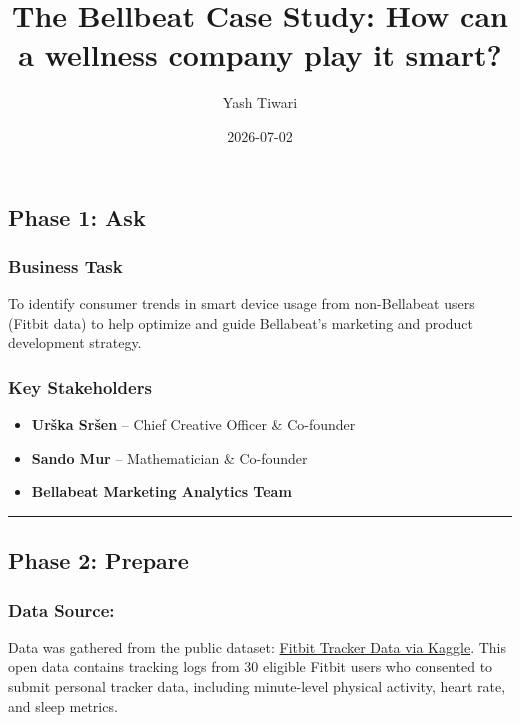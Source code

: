 \documentclass[
]{article}
\title{The Bellbeat Case Study: How can a wellness company play it
smart?}
\author{Yash Tiwari}
\date{2026-07-02}
\providecommand{\tightlist}{%
  \setlength{\itemsep}{0pt}\setlength{\parskip}{0pt}}
\begin{document}
\maketitle

\subsection{Phase 1: Ask}\label{phase-1-ask}

\subsubsection{Business Task}\label{business-task}

To identify consumer trends in smart device usage from non-Bellabeat
users (Fitbit data) to help optimize and guide Bellabeat's marketing and
product development strategy.

\subsubsection{Key Stakeholders}\label{key-stakeholders}

\begin{itemize}
\tightlist
\item
  \textbf{Urška Sršen} -- Chief Creative Officer \& Co-founder
\item
  \textbf{Sando Mur} -- Mathematician \& Co-founder
\item
  \textbf{Bellabeat Marketing Analytics Team}
\end{itemize}

\begin{center}\rule{0.5\linewidth}{0.5pt}\end{center}

\subsection{Phase 2: Prepare}\label{phase-2-prepare}

\subsubsection{Data Source:}\label{data-source}

Data was gathered from the public dataset:
\href{https://www.kaggle.com/datasets/arashnic/fitbit}{Fitbit Tracker
Data via Kaggle}. This open data contains tracking logs from 30 eligible
Fitbit users who consented to submit personal tracker data, including
minute-level physical activity, heart rate, and sleep metrics.
\end{document}
